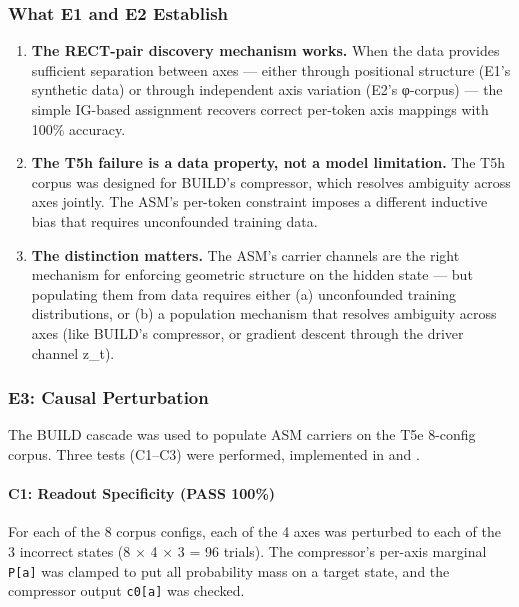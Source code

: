 \documentclass[
  twocolumn,
  10pt,
  a4paper]{article}
\begin{document}
\hypertarget{what-e1-and-e2-establish}{%
\subsubsection{What E1 and E2
Establish}\label{what-e1-and-e2-establish}}

\begin{enumerate}
\def\labelenumi{\arabic{enumi}.}
\item
  \textbf{The RECT-pair discovery mechanism works.} When the data
  provides sufficient separation between axes --- either through
  positional structure (E1's synthetic data) or through independent axis
  variation (E2's φ-corpus) --- the simple IG-based assignment recovers
  correct per-token axis mappings with 100\% accuracy.
\item
  \textbf{The T5h failure is a data property, not a model limitation.}
  The T5h corpus was designed for BUILD's compressor, which resolves
  ambiguity across axes jointly. The ASM's per-token constraint imposes
  a different inductive bias that requires unconfounded training data.
\item
  \textbf{The distinction matters.} The ASM's carrier channels are the
  right mechanism for enforcing geometric structure on the hidden state
  --- but populating them from data requires either (a) unconfounded
  training distributions, or (b) a population mechanism that resolves
  ambiguity across axes (like BUILD's compressor, or gradient descent
  through the driver channel z\_t).
\end{enumerate}

\hypertarget{e3-causal-perturbation}{%
\subsubsection{E3: Causal Perturbation}\label{e3-causal-perturbation}}

The BUILD cascade was used to populate ASM carriers on the T5e 8-config
corpus. Three tests (C1--C3) were performed, implemented in
\texttt{} and
\texttt{}.

\hypertarget{c1-readout-specificity-pass-100}{%
\paragraph{C1: Readout Specificity (PASS
100\%)}\label{c1-readout-specificity-pass-100}}

For each of the 8 corpus configs, each of the 4 axes was perturbed to
each of the 3 incorrect states (8 × 4 × 3 = 96 trials). The compressor's
per-axis marginal \texttt{P{[}a{]}} was clamped to put all probability
mass on a target state, and the compressor output \texttt{c0{[}a{]}} was
checked.
\end{document}

